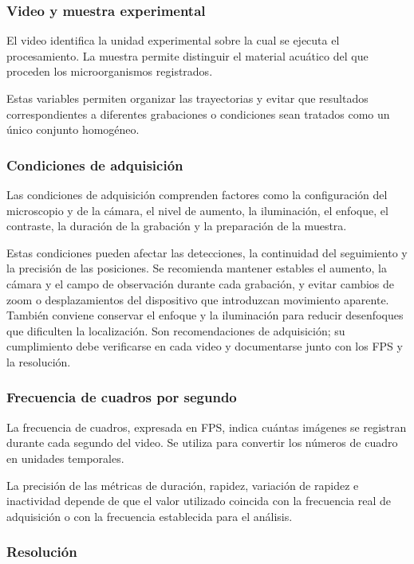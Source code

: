 \subsubsection{Video y muestra experimental}

El video identifica la unidad experimental sobre la cual se ejecuta el procesamiento. La muestra permite distinguir el material acuático del que proceden los microorganismos registrados.

Estas variables permiten organizar las trayectorias y evitar que resultados correspondientes a diferentes grabaciones o condiciones sean tratados como un único conjunto homogéneo.

\subsubsection{Condiciones de adquisición}

Las condiciones de adquisición comprenden factores como la configuración del microscopio y de la cámara, el nivel de aumento, la iluminación, el enfoque, el contraste, la duración de la grabación y la preparación de la muestra.

Estas condiciones pueden afectar las detecciones, la continuidad del seguimiento y la precisión de las posiciones. Se recomienda mantener estables el aumento, la cámara y el campo de observación durante cada grabación, y evitar cambios de zoom o desplazamientos del dispositivo que introduzcan movimiento aparente. También conviene conservar el enfoque y la iluminación para reducir desenfoques que dificulten la localización. Son recomendaciones de adquisición; su cumplimiento debe verificarse en cada video y documentarse junto con los FPS y la resolución.

\subsubsection{Frecuencia de cuadros por segundo}

La frecuencia de cuadros, expresada en FPS, indica cuántas imágenes se registran durante cada segundo del video. Se utiliza para convertir los números de cuadro en unidades temporales.

La precisión de las métricas de duración, rapidez, variación de rapidez e inactividad depende de que el valor utilizado coincida con la frecuencia real de adquisición o con la frecuencia establecida para el análisis.

\subsubsection{Resolución}


